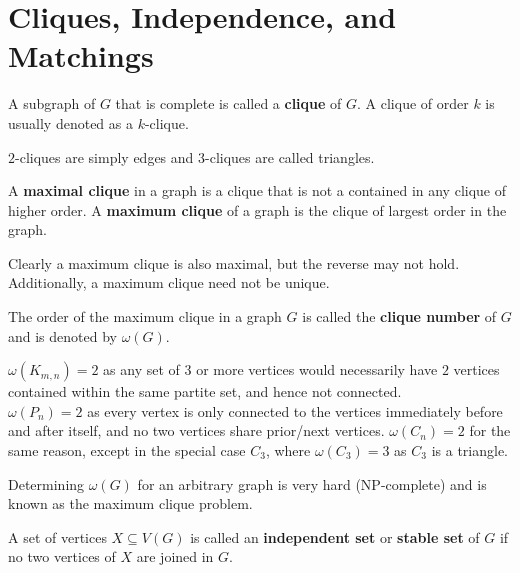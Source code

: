 \section{Cliques, Independence, and Matchings}
 \begin{definition}[Cliques]
 	A subgraph of $G$ that is complete is called a \textbf{clique} of $G$. A clique of order $k$ is usually denoted as a $k$-clique.
 \end{definition}
 \begin{remark}
 	$2$-cliques are simply edges and $3$-cliques are called triangles.
 \end{remark}
 \begin{definition}
 	A \textbf{maximal clique} in a graph is a clique that is not a contained in any clique of higher order. A \textbf{maximum clique} of a graph is the clique of largest order in the graph.
 \end{definition}
 \begin{remark}
 	Clearly a maximum clique is also maximal, but the reverse may not hold. Additionally, a maximum clique need not be unique.
 \end{remark}
 \begin{definition}
	 The order of the maximum clique in a graph $G$ is called the \textbf{clique number} of $G$ and is denoted by $\omega  \left( G \right) $.
 \end{definition}
 \begin{problem}
	 $\omega \left( K_{m,n} \right) = 2$ as any set of $3$ or more vertices would necessarily have $2$ vertices contained within the same partite set, and hence not connected.\\
	 $\omega \left( P_{n} \right) = 2$ as every vertex is only connected to the vertices immediately before and after itself, and no two vertices share prior/next vertices.
	 $\omega \left( C_{n} \right) = 2 $ for the same reason, except in the special case $C_3$, where $\omega \left( C_3 \right) = 3$ as $C_3$ is a triangle.\\
 \end{problem}
 Determining $\omega \left( G \right) $ for an arbitrary graph is very hard (NP-complete) and is known as the maximum clique problem.
 \begin{definition}
	 A set of vertices $X \subseteq V\left( G \right)$ is called an \textbf{independent set} or \textbf{stable set} of $G$ if no two vertices of $X$ are joined in $G$.
 \end{definition}
